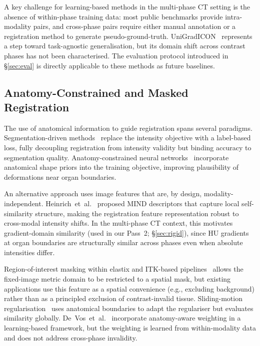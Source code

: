 \documentclass[10pt,twocolumn]{article}
\begin{document}
A key challenge for learning-based methods in the multi-phase CT
setting is the absence of within-phase training data: most public
benchmarks provide intra-modality pairs, and cross-phase pairs require
either manual annotation or a registration method to generate
pseudo-ground-truth.
UniGradICON~\cite{tian2023} represents a step toward task-agnostic
generalisation, but its domain shift across contrast phases has
not been characterised.
The evaluation protocol introduced in \S\ref{sec:eval} is directly
applicable to these methods as future baselines.

\subsection{Anatomy-Constrained and Masked Registration}
\label{sec:related_masked}

The use of anatomical information to guide registration spans several
paradigms.
Segmentation-driven methods~\cite{xu2019,hu2018} replace the intensity
objective with a label-based loss, fully decoupling registration from
intensity validity but binding accuracy to segmentation quality.
Anatomy-constrained neural networks~\cite{oktay2017} incorporate
anatomical shape priors into the training objective, improving
plausibility of deformations near organ boundaries.

An alternative approach uses image features that are, by design,
modality-independent.
Heinrich~et~al.~\cite{heinrich2012} proposed MIND descriptors that
capture local self-similarity structure, making the registration
feature representation robust to cross-modal intensity shifts.
In the multi-phase CT context, this motivates gradient-domain
similarity (used in our Pass~2; \S\ref{sec:rigid}), since HU gradients
at organ boundaries are structurally similar across phases even when
absolute intensities differ.

Region-of-interest masking within elastix and ITK-based
pipelines~\cite{klein2010} allows the fixed-image metric domain
to be restricted to a spatial mask, but existing applications
use this feature as a spatial convenience (e.g., excluding background)
rather than as a principled exclusion of contrast-invalid tissue.
Sliding-motion regularisation~\cite{papiez2014} uses anatomical
boundaries to adapt the regulariser but evaluates similarity globally.
De~Vos~et~al.~\cite{devos2019} incorporate anatomy-aware weighting
in a learning-based framework, but the weighting is learned from
within-modality data and does not address cross-phase invalidity.
\end{document}
